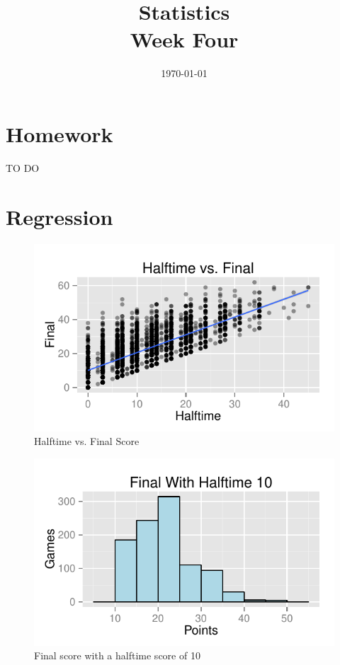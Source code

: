 \documentclass[landscape]{exam}
\title{Statistics \\ Week Four}
\date{\today}
\author{}
\begin{document}
\maketitle
\tableofcontents

  \section{Homework}

  \begin{itemize*}
    \item TO DO
  \end{itemize*}

  \section{Regression}

  \begin{figure}[H]
    \centering
    \includegraphics{figures/nfl/ht_vs_final.pdf}
    \caption{Halftime vs. Final Score}
  \end{figure}

  \begin{figure}[H]
    \centering
    \includegraphics{figures/nfl/ht_10_final.pdf}
    \caption{Final score with a halftime score of 10}
  \end{figure}
\end{document}
